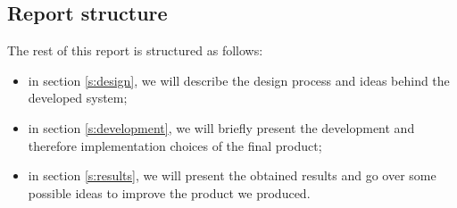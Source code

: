 \documentclass[../../main]{subfiles}
\begin{document}
\label{ss:report-structure}
\subsection{Report structure}

The rest of this report is structured as follows:
\begin{itemize}
    \item in section \ref{s:design}, we will describe the design process and ideas behind the developed system;
    \item in section \ref{s:development}, we will briefly present the development and therefore implementation choices of the final product;
    \item in section \ref{s:results}, we will present the obtained results and go over some possible ideas to improve the product we produced.
\end{itemize}
\end{document}
